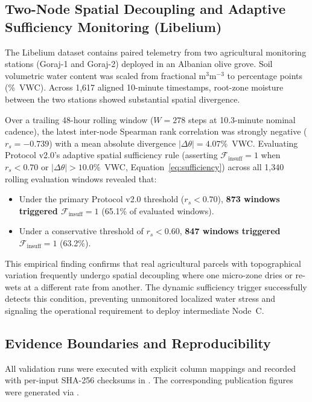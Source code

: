 \documentclass[10pt,twocolumn,a4paper]{article}
\begin{document}
\subsection{Two-Node Spatial Decoupling and Adaptive Sufficiency Monitoring (Libelium)}
The Libelium dataset contains paired telemetry from two agricultural monitoring stations (Goraj-1 and Goraj-2) deployed in an Albanian olive grove. Soil volumetric water content was scaled from fractional $\mathrm{m}^3\mathrm{m}^{-3}$ to percentage points (\%~VWC). Across 1,617 aligned 10-minute timestamps, root-zone moisture between the two stations showed substantial spatial divergence.

Over a trailing 48-hour rolling window ($W = 278$ steps at 10.3-minute nominal cadence), the latest inter-node Spearman rank correlation was strongly negative ($r_s = -0.739$) with a mean absolute divergence $|\Delta\theta| = 4.07\%$~VWC. Evaluating Protocol v2.0's adaptive spatial sufficiency rule (asserting $\mathcal{F}_{\text{insuff}} = 1$ when $r_s < 0.70$ or $|\Delta\theta| > 10.0\%$~VWC, Equation~\ref{eq:sufficiency}) across all 1,340 rolling evaluation windows revealed that:
\begin{itemize}\setlength{\itemsep}{1pt}\setlength{\parskip}{0pt}
  \item Under the primary Protocol v2.0 threshold ($r_s < 0.70$), \textbf{873 windows triggered $\mathcal{F}_{\text{insuff}} = 1$} (65.1\% of evaluated windows).
  \item Under a conservative threshold of $r_s < 0.60$, \textbf{847 windows triggered $\mathcal{F}_{\text{insuff}} = 1$} (63.2\%).
\end{itemize}
This empirical finding confirms that real agricultural parcels with topographical variation frequently undergo spatial decoupling where one micro-zone dries or re-wets at a different rate from another. The dynamic sufficiency trigger successfully detects this condition, preventing unmonitored localized water stress and signaling the operational requirement to deploy intermediate Node~C.

\subsection{Evidence Boundaries and Reproducibility}
All validation runs were executed with explicit column mappings and recorded with per-input SHA-256 checksums in . The corresponding publication figures were generated via .
\end{document}
